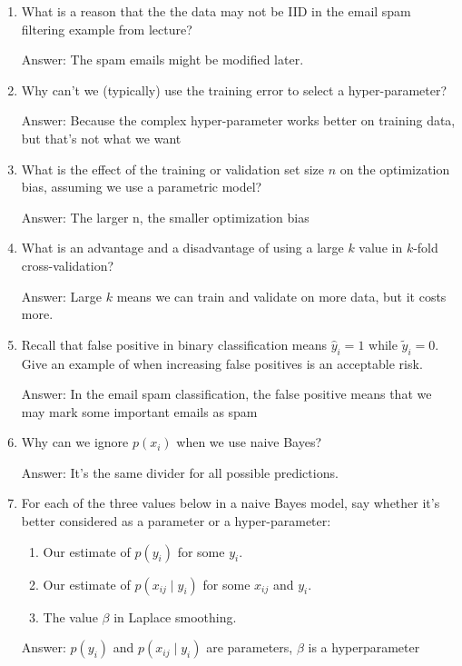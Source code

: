 \documentclass{article}
\newcommand{\gre}[1]{\textcolor{gre}{#1}}
\newcommand\ans[1]{\par\gre{Answer: #1}}
\newenvironment{answer}{\par\begingroup\color{gre}Answer: }{\endgroup}
\begin{document}
    \begin{enumerate}
        \item What is a reason that the the data may not be IID in the email spam filtering example from lecture?
        \begin{answer}
            The spam emails might be modified later.
        \end{answer}
        
        \item Why can't we (typically) use the training error to select a hyper-parameter?
        \begin{answer}
            Because the complex hyper-parameter works better on training data, but that's not what we want
        \end{answer}

        \item What is the effect of the training or validation set size $n$ on the optimization bias, assuming we use a parametric model?
        \ans{The larger n, the smaller optimization bias}

        \item What is an advantage and a disadvantage of using a large $k$ value in $k$-fold cross-validation?
        \ans{Large $k$ means we can train and validate on more data, but it costs more.}

        \item Recall that false positive in binary classification means $\hat y_i=1$ while $\tilde y_i = 0$. Give an example of when increasing false positives is an acceptable risk.
        \ans{In the email spam classification, the false positive means that we may mark some important emails as spam}

        \item Why can we ignore $p(x_i)$ when we use naive Bayes?
        \begin{answer}
            It's the same divider for all possible predictions.
        \end{answer}

        \item For each of the three values below in a naive Bayes model, say whether it's better considered as a parameter or a hyper-parameter:
        \begin{enumerate}
            \item Our estimate of $p(y_i)$ for some $y_i$.
            \item Our estimate of $p(x_{ij} \mid y_i)$ for some $x_{ij}$ and $y_i$.
            \item The value $\beta$ in Laplace smoothing.
        \end{enumerate}
        \ans{$p(y_i)$ and $p(x_{ij} \mid y_i)$ are parameters, $\beta$ is a hyperparameter}


\end{enumerate}
\end{document}
